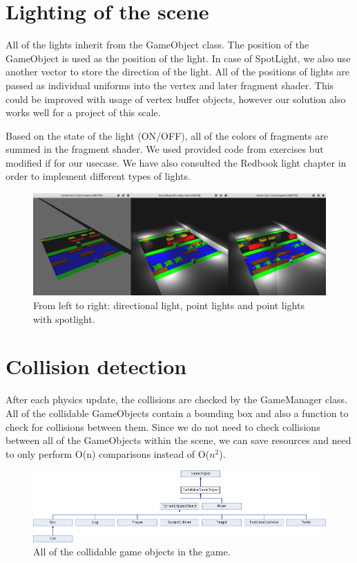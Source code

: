 \documentclass[a4paper,10pt]{article}
\begin{document}
\section{Lighting of the scene}
All of the lights inherit from the GameObject class. The position of the GameObject is used as the position of the light. In case of SpotLight, we also use another vector to store the direction of the light. All of the positions of lights are passed as individual uniforms into the vertex and later fragment shader. This could be improved with usage of vertex buffer objects, however our solution also works well for a project of this scale.

Based on the state of the light (ON/OFF), all of the colors of fragments are summed in the fragment shader. We used provided code from exercises but modified if for our usecase. We have also consulted the Redbook light chapter in order to implement different types of lights.

\begin{figure}[!htb]
	\centering
  	\includegraphics[width=\linewidth]{images/image3.png}
  	\caption{From left to right: directional light, point lights and point lights with spotlight.}
\end{figure}

\section{Collision detection}
After each physics update, the collisions are checked by the GameManager class. All of the collidable GameObjects contain a bounding box and also a function to check for collisions between them. Since we do not need to check collisions between all of the GameObjects within the scene, we can save resources and need to only perform O(n) comparisons instead of O($n^{2}$).

\begin{figure}[!htb]
	\centering
  	\includegraphics[width=\linewidth]{images/image5.png}
  	\caption{All of the collidable game objects in the game.}
\end{figure}
\end{document}
